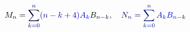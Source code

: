 \documentclass[12pt]{article}
\begin{document}
\makeatletter
\renewcommand*{\@textcolor}[3]{%
  \protect\leavevmode
  \begingroup
    \color#1{#2}#3%
  \endgroup
}
\makeatother
\begin{displaymath}
\mathcolor[RGB]{0,0,15}{M} _ { \mathcolor[RGB]{0,0,30}{n} } \mathcolor[RGB]{0,0,45}{=} \mathcolor[RGB]{0,0,60}{\sum} _ { \mathcolor[RGB]{0,0,75}{k} \mathcolor[RGB]{0,0,90}{=} \mathcolor[RGB]{0,0,105}{0} } ^ { \mathcolor[RGB]{0,0,120}{n} } \mathcolor[RGB]{0,0,135}{(} \mathcolor[RGB]{0,0,150}{n} \mathcolor[RGB]{0,0,165}{-} \mathcolor[RGB]{0,0,180}{k} \mathcolor[RGB]{0,0,195}{+} \mathcolor[RGB]{0,0,210}{4} \mathcolor[RGB]{0,0,225}{)} \mathcolor[RGB]{0,0,240}{A} _ { \mathcolor[RGB]{0,0,255}{k} } \mathcolor[RGB]{0,15,0}{B} _ { \mathcolor[RGB]{0,15,15}{n} \mathcolor[RGB]{0,15,30}{-} \mathcolor[RGB]{0,15,45}{k} } \mathcolor[RGB]{0,15,60}{,} \quad \mathcolor[RGB]{0,15,75}{N} _ { \mathcolor[RGB]{0,15,90}{n} } \mathcolor[RGB]{0,15,105}{=} \mathcolor[RGB]{0,15,120}{\sum} _ { \mathcolor[RGB]{0,15,135}{k} \mathcolor[RGB]{0,15,150}{=} \mathcolor[RGB]{0,15,165}{0} } ^ { \mathcolor[RGB]{0,15,180}{n} } \mathcolor[RGB]{0,15,195}{A} _ { \mathcolor[RGB]{0,15,210}{k} } \mathcolor[RGB]{0,15,225}{B} _ { \mathcolor[RGB]{0,15,240}{n} \mathcolor[RGB]{0,15,255}{-} \mathcolor[RGB]{0,30,0}{k} }
\end{displaymath}
\end{document}

